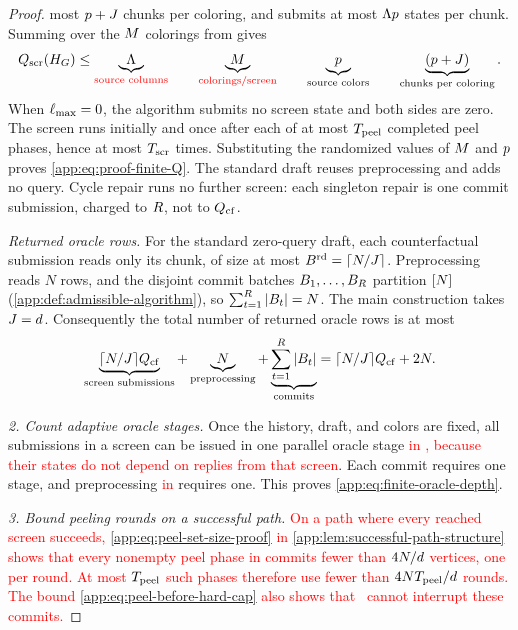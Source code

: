 \begin{proof}
most $p+J$ chunks per coloring, and
 submits at most $\Lambda p$
states per chunk.  Summing over the $M$ colorings from
 gives
\begin{equation}
 Q_{\mathrm{scr}}(H_{G})
 \le
 \underbrace{\Lambda}_{\text{\textcolor{red}{source columns}}}\qquad
 \underbrace{M}_{\text{\textcolor{red}{colorings/screen}}}\qquad
 \underbrace{p}_{\text{source colors}}\qquad
 \underbrace{(p+J)}_{\text{chunks per coloring}}.
 \label{app:eq:proof-one-screen-count}
\end{equation}
When $\ell_{\max}=0$, the algorithm submits no screen state and both sides
are zero.  The screen runs initially and once after each of at most
$T_{\mathrm{peel}}$ completed peel phases, hence at most $T_{\mathrm{scr}}$ times.
Substituting the randomized values of $M$ and $p$
proves \eqref{app:eq:proof-finite-Q}.  The standard draft reuses preprocessing
and adds no query. Cycle repair runs no further screen: each singleton
repair is one commit submission, charged to $R$, not to
$Q_{\mathrm{cf}}$.

\emph{Returned oracle rows.}
For the standard zero-query draft, each counterfactual submission reads
only its chunk, of size at most $B^{\mathrm{rd}}=\lceil N/J\rceil$.
Preprocessing reads $N$ rows, and the disjoint commit batches
$B_1,\ldots,B_{R}$ partition $[N]$
(\cref{app:def:admissible-algorithm}), so $\sum_{t=1}^{R}|B_t|=N$.
The main construction takes $J=d$.
Consequently the total number of returned oracle rows is at most
\[
 \underbrace{\lceil N/J\rceil Q_{\mathrm{cf}}}_{\text{screen submissions}}
 +\underbrace{N}_{\text{preprocessing}}
 +\underbrace{\sum_{t=1}^{R}|B_t|}_{\text{commits}}
 =\lceil N/J\rceil Q_{\mathrm{cf}}+2N.
\]


\emph{2. Count adaptive oracle stages.}
Once the history, draft, and colors are fixed, all submissions in a screen
can be issued in one parallel oracle stage \textcolor{red}{in
, because their states do not depend on replies from
that screen}.  Each commit requires one stage,
and preprocessing \textcolor{red}{in } requires one. This proves
\eqref{app:eq:finite-oracle-depth}.


\emph{3. Bound peeling rounds on a successful path.}
\textcolor{red}{On a path where every reached screen succeeds,
\eqref{app:eq:peel-set-size-proof} in
\cref{app:lem:successful-path-structure} shows that every nonempty peel phase in
 commits fewer than $4N/d$ vertices,
one per round.  At most $T_{\mathrm{peel}}$ such phases therefore use fewer than
$4NT_{\mathrm{peel}}/d$ rounds.
The bound \eqref{app:eq:peel-before-hard-cap} also shows that
\AlgoGuardRef\ cannot interrupt these commits.}



\end{proof}

